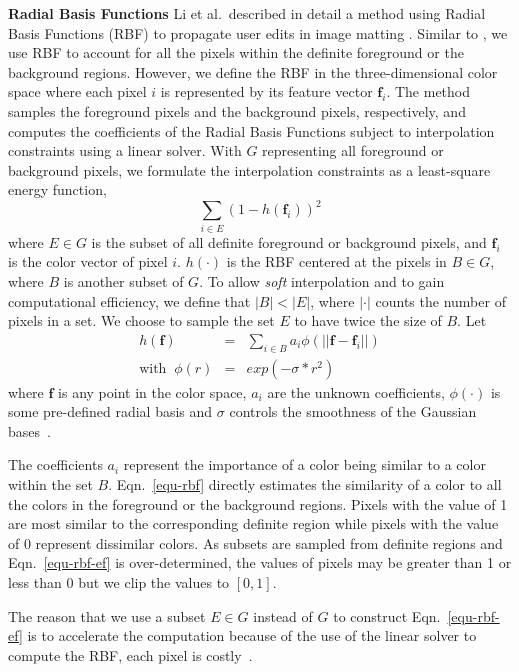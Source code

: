 \textbf{Radial Basis Functions}
Li et al.\ described in detail a method using Radial Basis Functions (RBF) to propagate user edits in image matting \cite{li2010}.
Similar to \cite{li2010}, we use RBF to account for all the pixels within the definite foreground or the background regions.
However, we define the RBF in the three-dimensional color space where each pixel $i$ is represented by its feature vector $\mathbf{f}_{i}$.
The method samples the foreground pixels and the background pixels, respectively, and computes the coefficients of the Radial Basis Functions subject to interpolation constraints using a linear solver.
With $G$ representing all foreground or background pixels, we formulate the interpolation constraints as a least-square energy function, 
\begin{equation}
\label{equ-rbf-ef}
\sum_{i\in E}{(1-h(\mathbf{f}_{i}))^2}
\end{equation}
where $E\in G$ is the subset of all definite foreground or background pixels, and $\mathbf{f}_{i}$ is the color vector of pixel $i$.
$h(\cdot)$ is the RBF centered at the pixels in $B\in G$, where $B$ is another subset of $G$.
To allow {\em soft} interpolation and to gain computational efficiency, we define that $|B| < |E|$, where $|\cdot|$ counts the number of pixels in a set. We choose to sample the set $E$ to have twice the size of $B$. Let
\begin{eqnarray}
\label{equ-rbf}
h(\mathbf{f})&=&\sum_{i\in B}{a_{i}\phi(||\mathbf{f}-\mathbf{f}_{i}||)} \\
\mbox{with}\;\;
\phi(r)&=&exp(-\sigma *r^2) \nonumber
\end{eqnarray}
where $\mathbf{f}$ is any point in the color space, $a_{i}$ are the unknown coefficients, $\phi(\cdot)$ is some pre-defined radial basis and $\sigma$ controls the smoothness of the Gaussian bases~\cite{li2010}.

The coefficients $a_{i}$ represent the importance of a color being similar to a color within the set $B$. Eqn.~\ref{equ-rbf} directly estimates the similarity of a color to all the colors in the foreground or the background regions. Pixels with the value of 1 are most similar to the corresponding definite region while pixels with the value of 0 represent dissimilar colors. As subsets are sampled from definite regions and Eqn.~\ref{equ-rbf-ef} is over-determined, the values of pixels may be greater than 1 or less than 0 but we clip the values to $[0,1]$.

The reason that we use a subset $E\in G$ instead of $G$ to construct Eqn.~\ref{equ-rbf-ef} is to accelerate the computation because of the use of the linear solver to compute the RBF, each pixel is costly~\cite{tao2012}.

